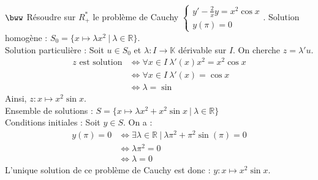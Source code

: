 \documentclass[11pt]{article}
\begin{document}
\begin{exercice}{$\bww$}{}
    Résoudre sur $R_+^*$ le problème de Cauchy $\begin{cases} y' - \frac{2}{x}y = x^2\cos x\\ y(\pi)=0 \end{cases}$.
    \tcblower
    Solution homogène : $S_0 = \{x \mapsto \lambda x^2 ~ | ~ \lambda \in\mathbb{R}\}$.\\
    Solution particulière : Soit $u\in S_0$ et $\lambda : I \rightarrow \mathbb{K}$ dérivable sur $I$. On cherche $z = \lambda'u$.
    \begin{align*}
        z \text{ est solution} &\iff \forall{x\in I} ~ \lambda'(x)x^2 = x^2\cos x\\
        &\iff \forall{x\in I} ~ \lambda'(x) = \cos x\\
        &\iff \lambda = \sin
    \end{align*}
    Ainsi, $z:x\mapsto x^2\sin x$.\\
    Ensemble de solutions : $S=\{x\mapsto\lambda x^2 + x^2\sin x ~ | ~ \lambda \in \mathbb{R}\}$\\
    Conditions initiales : Soit $y \in S$. On a :
    \begin{align*}
        y(\pi) = 0 &\iff \exists{\lambda\in\mathbb{R}} ~ | ~ \lambda\pi^2 + \pi^2\sin(\pi) = 0\\
        &\iff \lambda\pi^2 = 0\\
        &\iff \lambda = 0
    \end{align*}
    L'unique solution de ce problème de Cauchy est donc : $y:x\mapsto x^2\sin x$.
\end{exercice}
\end{document}
